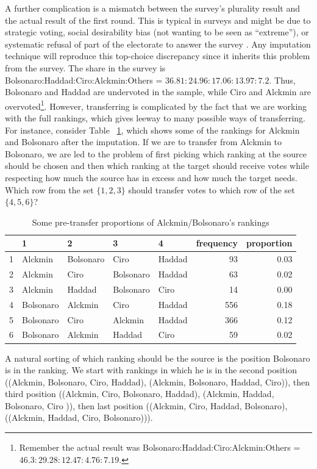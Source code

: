 \documentclass[hidelinks,11pt]{article}
\begin{document}
A further complication is a mismatch between the survey's plurality result and
the actual result of the first round. This is typical in surveys and might be
due to strategic voting, social desirability bias (not wanting to be seen as
``extreme''), or systematic refusal of part of the electorate to answer the
survey \parencite{nishimura2016alternative}. Any imputation technique will
reproduce this top-choice discrepancy since it inherits this problem from the
survey. The share in the survey is Bolsonaro:Haddad:Ciro:Alckmin:Others =
\(36.81 : 24.96 : 17.06: 13.97 : 7.2 \). Thus, Bolsonaro and Haddad are
undervoted in the sample, while Ciro and Alckmin are overvoted\footnote{Remember
the actual result was Bolsonaro:Haddad:Ciro:Alckmin:Others =
\(46.3 : 29.28 : 12.47 : 4.76 : 7.19 \).}. However, transferring is complicated
by the fact that we are working with the full rankings, which gives leeway to
many possible ways of transferring. For instance, consider Table
~\ref{tbl:overunderex}, which shows some of the rankings for Alckmin and
Bolsonaro after the imputation. If we are to transfer from Alckmin to Bolsonaro,
we are led to the problem of first picking which ranking at the source should be
chosen and then which ranking at the target should receive votes while
respecting how much the source has in excess and how much the target needs.
Which row from the set \(\{1,2,3\}\) should transfer votes to which row of the
set \(\{4,5,6\}\)?

\begin{table}[!h] \centering %
\begin{tabular}{rllllrr} \hline & 1 & 2 & 3 & 4 & frequency & proportion \\
\hline 1 & Alckmin & Bolsonaro & Ciro & Haddad & 93 & 0.03 \\ 2 & Alckmin & Ciro
& Bolsonaro & Haddad & 63 & 0.02 \\ 3 & Alckmin & Haddad & Bolsonaro & Ciro & 14
& 0.00 \\ 4 & Bolsonaro & Alckmin & Ciro & Haddad & 556 & 0.18 \\ 5 & Bolsonaro
& Ciro & Alckmin & Haddad & 366 & 0.12 \\ 6 & Bolsonaro & Alckmin & Haddad &
Ciro & 59 & 0.02 \\ \hline
\end{tabular} %
\caption{Some pre-transfer proportions of Alckmin/Bolsonaro's rankings}
\label{tbl:overunderex}
\end{table}

A natural sorting of which ranking should be the source is the position
Bolsonaro is in the ranking. We start with rankings in which he is in the second
position ((Alckmin, Bolsonaro, Ciro, Haddad), (Alckmin, Bolsonaro, Haddad,
Ciro)), then third position ((Alckmin, Ciro, Bolsonaro, Haddad), (Alckmin,
Haddad, Bolsonaro, Ciro )), then last position ((Alckmin, Ciro, Haddad,
Bolsonaro), ((Alckmin, Haddad, Ciro, Bolsonaro))).
\end{document}
